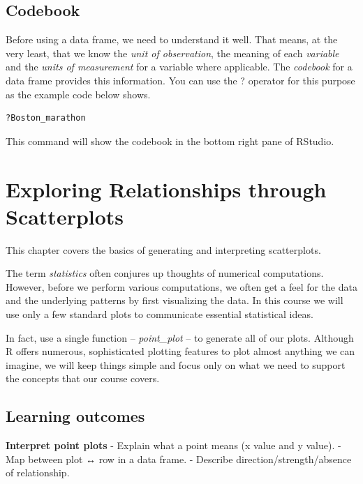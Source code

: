 \documentclass[
  12pt,
  letterpaper,
  DIV=11,
  numbers=noendperiod]{scrreprt}
\begin{document}
\section{Codebook}\label{codebook}

Before using a data frame, we need to understand it well. That means, at
the very least, that we know the \emph{unit of observation}, the meaning
of each \emph{variable} and the \emph{units of measurement} for a
variable where applicable. The \emph{codebook} for a data frame provides
this information. You can use the ? operator for this purpose as the
example code below shows.

\begin{lstlisting}[language=R]
?Boston_marathon
\end{lstlisting}

This command will show the codebook in the bottom right pane of RStudio.

\chapter{Exploring Relationships through
Scatterplots}\label{sec-visualizing-relationships}

This chapter covers the basics of generating and interpreting
scatterplots.

The term \emph{statistics} often conjures up thoughts of numerical
computations. However, before we perform various computations, we often
get a feel for the data and the underlying patterns by first visualizing
the data. In this course we will use only a few standard plots to
communicate essential statistical ideas.

In fact, use a single function -- \emph{point\_plot} -- to generate all
of our plots. Although R offers numerous, sophisticated plotting
features to plot almost anything we can imagine, we will keep things
simple and focus only on what we need to support the concepts that our
course covers.

\section*{Learning outcomes}\label{learning-outcomes-1}


\textbf{Interpret point plots} - Explain what a point means (x value and
y value). - Map between plot ↔ row in a data frame. - Describe
direction/strength/absence of relationship.
\end{document}
